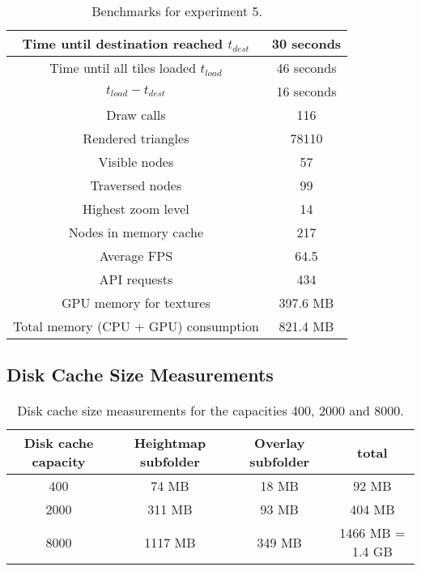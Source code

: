 \begin{table}[H]
  \begin{center}
    \begin{tabular}{ c|c }
      Time until destination reached $t_{dest}$ & 30 seconds \\
      \hline
      Time until all tiles loaded $t_{load}$ & 46 seconds \\
      \hline
      $t_{load} - t_{dest}$ & 16 seconds \\
      \hline
      Draw calls & 116 \\
      \hline
      Rendered triangles & 78110 \\
      \hline
      Visible nodes & 57 \\
      \hline
      Traversed nodes & 99 \\
      \hline
      Highest zoom level & 14 \\
      \hline
      Nodes in memory cache & 217 \\
      \hline
      Average FPS & 64.5 \\
      \hline 
      API requests & 434 \\
      \hline
      GPU memory for textures & 397.6 MB \\
      \hline
      Total memory (CPU + GPU) consumption & 821.4 MB \\
    \end{tabular}
  \end{center}
  \caption{Benchmarks for experiment 5.}\label{tbl:results-5}
  \end{table}

\subsection{Disk Cache Size Measurements}
\begin{table}[H]
  \begin{center}
    \begin{tabular}{ c|c|c|c }
      Disk cache capacity &  Heightmap subfolder & Overlay subfolder & total \\ 
      \hline
      400 & 74 MB & 18 MB & 92 MB\\
      \hline
      2000 & 311 MB & 93 MB & 404 MB\\
      \hline
      8000 & 1117 MB & 349 MB & 1466 MB = 1.4 GB
    \end{tabular}
  \end{center}
  \caption{Disk cache size measurements for the capacities 400, 2000 and 8000.}\label{tbl:results-disk}
  \end{table}